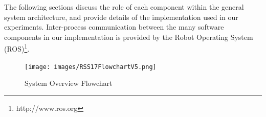 \documentclass[journal]{IEEEtran}
\newcommand{\separator}{ \noindent \rule{\columnwidth}{1pt} }
\newenvironment{old}{\color{Maroon} \separator \textbf{[\textit{Old:}]} }{\ignorespacesafterend \separator}
\begin{document}
The following sections discuss the role of each component within the general system architecture, and provide details of the implementation used in our experiments. Inter-process communication between the many software components in our implementation is provided by the Robot Operating System (ROS)\footnote{http://www.ros.org}.  
%


%
\begin{figure}
\begin{center}
\texttt{[image: images/RSS17FlowchartV5.png]}
\caption{System Overview Flowchart}
\label{fig:overview}
\end{center}
\vspace{-1em}
\end{figure}
\end{document}
